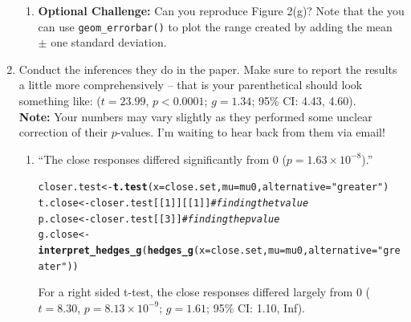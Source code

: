 \documentclass{article}\usepackage[]{graphicx}\usepackage[]{xcolor}
\makeatletter
\newcommand{\hlnum}[1]{\textcolor[rgb]{0.686,0.059,0.569}{#1}}%
\newcommand{\hlsng}[1]{\textcolor[rgb]{0.192,0.494,0.8}{#1}}%
\newcommand{\hlcom}[1]{\textcolor[rgb]{0.678,0.584,0.686}{\textit{#1}}}%
\newcommand{\hldef}[1]{\textcolor[rgb]{0.345,0.345,0.345}{#1}}%
\newcommand{\hlkwb}[1]{\textcolor[rgb]{0.69,0.353,0.396}{#1}}%
\newcommand{\hlkwc}[1]{\textcolor[rgb]{0.333,0.667,0.333}{#1}}%
\newcommand{\hlkwd}[1]{\textcolor[rgb]{0.737,0.353,0.396}{\textbf{#1}}}%
\newenvironment{kframe}{%
 \def\at@end@of@kframe{}%
 \ifinner\ifhmode%
  \def\at@end@of@kframe{\end{minipage}}%
  \begin{minipage}{\columnwidth}%
 \fi\fi%
 \def\FrameCommand##1{\hskip\@totalleftmargin \hskip-\fboxsep
 \colorbox{shadecolor}{##1}\hskip-\fboxsep
     \hskip-\linewidth \hskip-\@totalleftmargin \hskip\columnwidth}%
 \MakeFramed {\advance\hsize-\width
   \@totalleftmargin\z@ \linewidth\hsize
   \@setminipage}}%
 {\par\unskip\endMakeFramed%
 \at@end@of@kframe}
\newenvironment{knitrout}{}{} %
\makeatother
\begin{document}
\begin{enumerate}
\begin{enumerate}
  \item \textbf{Optional Challenge:} Can you reproduce Figure 2(g)?
  Note that the you can use \texttt{geom\_errorbar()} to plot
  the range created by adding the mean $\pm$ one standard deviation.
\end{enumerate}
\item Conduct the inferences they do in the paper. Make sure to report the results
a little more comprehensively -- that is your parenthetical should look something
like: ($t=23.99$, $p<0.0001$; $g=1.34$; 95\% CI: 4.43, 4.60).\\
\textbf{Note:} Your numbers may vary slightly as they performed some unclear
correction of their $p$-values. I'm waiting to hear back from them via email!


\begin{enumerate}
  \item ``The close responses differed significantly from 0 ($p=1.63 \times 10^{-8}$).''
\begin{knitrout}\scriptsize
{}\color{fgcolor}\begin{kframe}
\begin{alltt}
\hldef{closer.test} \hlkwb{<-} \hlkwd{t.test}\hldef{(}\hlkwc{x}\hldef{=close.set,} \hlkwc{mu} \hldef{= mu0,} \hlkwc{alternative} \hldef{=} \hlsng{"greater"}\hldef{)}
\hldef{t.close} \hlkwb{<-} \hldef{closer.test[[}\hlnum{1}\hldef{]][[}\hlnum{1}\hldef{]]} \hlcom{#finding the t value }
\hldef{p.close} \hlkwb{<-} \hldef{closer.test[[}\hlnum{3}\hldef{]]} \hlcom{#finding the p value}
\hldef{g.close} \hlkwb{<-} \hlkwd{interpret_hedges_g}\hldef{(}\hlkwd{hedges_g}\hldef{(}\hlkwc{x} \hldef{= close.set,} \hlkwc{mu} \hldef{= mu0,} \hlkwc{alternative} \hldef{=} \hlsng{"greater"}\hldef{))}
\end{alltt}
\end{kframe}
\end{knitrout}
For a right sided t-test, the close responses differed largely from 0 ($t=8.30$, $p=8.13 \times 10^{-9}$; $g=1.61$; 95\% CI: 1.10, Inf). 


\end{enumerate}
\end{enumerate}
\end{document}
